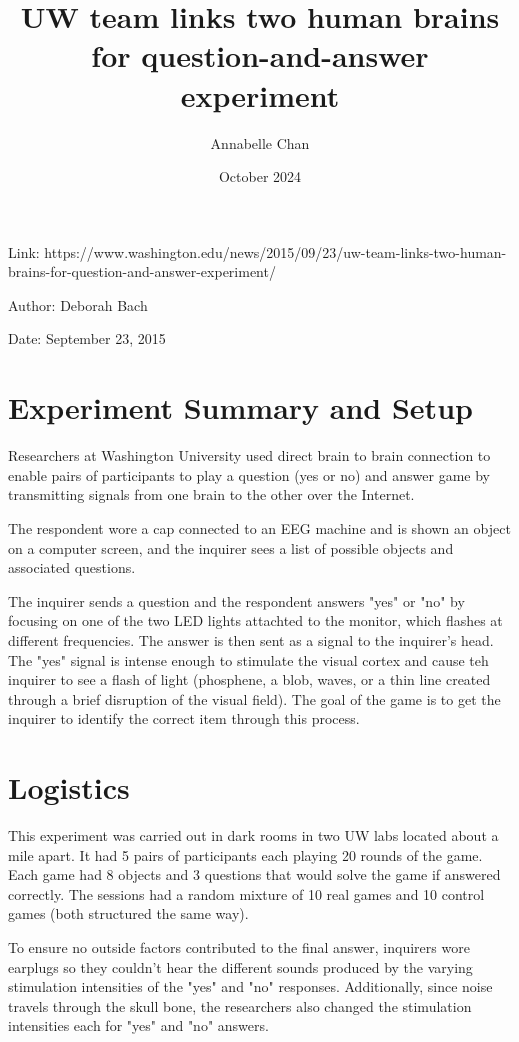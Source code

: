 \documentclass[12pt]{article}
\title{UW team links two human brains for question-and-answer experiment}
\author{Annabelle Chan}
\date{October 2024}
\begin{document}
\maketitle

Link: https://www.washington.edu/news/2015/09/23/uw-team-links-two-human-brains-for-question-and-answer-experiment/

Author: Deborah Bach

Date: September 23, 2015

\section{Experiment Summary and Setup}

Researchers at Washington University used direct brain to brain connection to enable pairs of participants to play a question (yes or no) and answer game by transmitting signals from one brain to the other over the Internet.

The respondent wore a cap connected to an EEG machine and is shown an object on a computer screen, and the inquirer sees a list of possible objects and associated questions.

The inquirer sends a question and the respondent answers "yes" or "no" by focusing on one of the two LED lights attachted to the monitor, which flashes at different frequencies. The answer is then sent as a signal to the inquirer's head. The "yes" signal is intense enough to stimulate the visual cortex and cause teh inquirer to see a flash of light (phosphene, a blob, waves, or a thin line created through a brief disruption of the visual field). The goal of the game is to get the inquirer to identify the correct item through this process.

\section{Logistics}

This experiment was carried out in dark rooms in two UW labs located about a mile apart. It had 5 pairs of participants each playing 20 rounds of the game. Each game had 8 objects and 3 questions that would solve the game if answered correctly. The sessions had a random mixture of 10 real games and 10 control games (both structured the same way).

To ensure no outside factors contributed to the final answer, inquirers wore earplugs so they couldn't hear the different sounds produced by the varying stimulation intensities of the "yes" and "no" responses. Additionally, since noise travels through the skull bone, the researchers also changed the stimulation intensities each for "yes" and "no" answers. 
\end{document}
